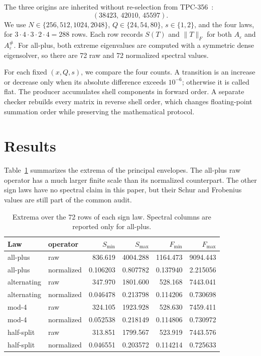 \documentclass[10pt]{article}
\begin{document}
The three origins are inherited without re-selection from TPC-356~\cite{tpc356}:
\[
 (38423,\,42010,\,45597).
\]
We use $N\in\{256,512,1024,2048\}$,
$Q\in\{24,54,80\}$, $s\in\{1,2\}$, and the four laws, for
$3\cdot4\cdot3\cdot2\cdot4=288$ rows.  Each row records $S(T)$ and
$\lVert T\rVert_F$ for both $A_\varepsilon$ and $A_\varepsilon^\#$.
For all-plus, both extreme eigenvalues are computed with a symmetric dense
eigensolver, so there are 72 raw and 72 normalized spectral values.

For each fixed $(x,Q,s)$, we compare the four counts.  A transition is an
increase or decrease only when its absolute difference exceeds $10^{-6}$;
otherwise it is called flat.  The producer accumulates shell components in
forward order.  A separate checker rebuilds every matrix in reverse shell
order, which changes floating-point summation order while preserving the
mathematical protocol.

\section{Results}

Table~\ref{tab:envelopes} summarizes the extrema of the principal envelopes.
The all-plus raw operator has a much larger finite scale than its normalized
counterpart.  The other sign laws have no spectral claim in this paper, but
their Schur and Frobenius values are still part of the common audit.

\begin{table}[t]
\centering
\caption{Extrema over the 72 rows of each sign law.  Spectral columns are
reported only for all-plus.}
\label{tab:envelopes}
\small
\begin{tabular}{llrrrr}
\toprule
Law & operator & $S_{\min}$ & $S_{\max}$ & $F_{\min}$ & $F_{\max}$\\
\midrule
all-plus & raw & 836.619 & 4004.288 & 1164.473 & 9094.443\\
all-plus & normalized & 0.106203 & 0.807782 & 0.137940 & 2.215056\\
alternating & raw & 347.970 & 1801.600 & 528.168 & 7443.041\\
alternating & normalized & 0.046478 & 0.213798 & 0.114206 & 0.730698\\
mod-4 & raw & 324.105 & 1923.928 & 528.630 & 7459.411\\
mod-4 & normalized & 0.052538 & 0.218149 & 0.114806 & 0.730972\\
half-split & raw & 313.851 & 1799.567 & 523.919 & 7443.576\\
half-split & normalized & 0.046551 & 0.203572 & 0.114214 & 0.725633\\
\bottomrule
\end{tabular}
\end{table}
\end{document}
